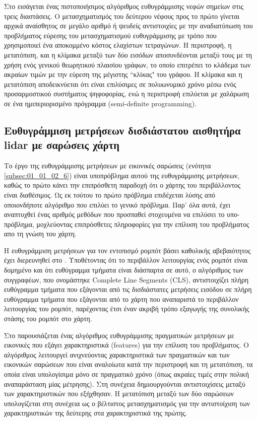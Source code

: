 Στο \cite{Yang2021} εισάγεται ένας πιστοποιήσιμος αλγόριθμος ευθυγράμμισης
νεφών σημείων στις τρεις διαστάσεις. Ο μετασχηματισμός του δεύτερου νέφους προς
το πρώτο γίνεται αρχικά αναίσθητος σε μεγάλο αριθμό ή ψευδείς αντιστοιχίες με
την αναδιατύπωση του προβλήματος εύρεσης του μετασχηματισμού ευθυγράμμισης με
τρόπο που χρησιμοποιεί ένα αποκομμένο κόστος ελαχίστων τετραγώνων. Η
περιστροφή, η μετατόπιση, και η κλίμακα μεταξύ των δύο εισόδων αποσυνδέονται
μεταξύ τους με τη χρήση ενός γενικού θεωρητικού πλαισίου γράφων, το οποίο
επιτρέπει το κλάδεμα των ακραίων τιμών με την εύρεση της μέγιστης ``κλίκας" του
γράφου.  Η κλίμακα και η μετατόπιση αποδεικνύεται ότι είναι επιλύσιμες σε
πολυωνυμικό χρόνο μέσω ενός προσαρμοστικού συστήματος ψηφοφορίας, ενώ η
περιστροφή επιλύεται με χαλάρωση σε ένα ημιπεριορισμένο πρόγραμμα
(semi-definite programming).

\subsection{Ευθυγράμμιση μετρήσεων δισδιάστατου αισθητήρα lidar με σαρώσεις
χάρτη}
\label{subsection:02_02_02:2}

Το έργο της ευθυγράμμισης μετρήσεων με εικονικές σαρώσεις (ενότητα
\ref{subsec:01_01_02_6}) είναι υποπρόβλημα αυτού της ευθυγράμμισης μετρήσεων,
καθώς το πρώτο κάνει την επιπρόσθετη παραδοχή ότι ο χάρτης του περιβάλλοντος
είναι διαθέσιμος. Ως εκ τούτου το πρώτο πρόβλημα επιδέχεται λύσης από
οποιονδήποτε αλγόριθμο που επιλύει το γενικό πρόβλημα. Παρ' όλα αυτά, έχει
αναπτυχθεί ένας αριθμός μεθόδων που προσπαθεί στοχευμένα να επιλύσει το
υπο-πρόβλημα, μοχλεύοντας επιπρόσθετες πληροφορίες για την επίλυση του
προβλήματος απο τη γνώση του χάρτη.

Η ευθυγράμμιση μετρήσεων για τον εντοπισμό ρομπότ βάσει καθολικής αβεβαιότητος
έχει διερευνηθεί στο \cite{XuZezhong}. Υποθέτοντας ότι το περιβάλλον
λειτουργίας ενός ρομπότ είναι δομημένο και ότι ευθύγραμμα τμήματα είναι
διάσπαρτα σε αυτό, ο αλγόριθμος των συγγραφέων, που ονομάστηκε Complete Line
Segments (CLS), αντιστοιχίζει πλήρη ευθύγραμμα τμήματα που εξάγονται από τις
δισδιάστατες μετρήσεις εισόδου σε πλήρη ευθύγραμμα τμήματα που εξάγονται από το
χάρτη που αναπαριστά το περιβάλλον λειτουργίας του ρομπότ, παρέχοντας έτσι έναν
ακριβή τρόπο εξαγωγής της συνολικής στάσης του ρομπότ στο χάρτη.

Στο \cite{Lingemann2005a} παρουσιάζεται ένας αλγόριθμος ευθυγράμμισης
πραγματικών μετρήσεων με εικονικές που εξάγει χαρακτηριστικά (features) για την
επίλυση του προβλήματος.  Ο αλγόριθμος λειτουργεί ανιχνεύοντας χαρακτηριστικά
των πραγματικών και των εικονικών σαρώσεων που είναι αναλοίωτα κατά την
περιστροφή και τη μετατόπιση, τα οποία είναι υπολογίσιμα μόνο σε πραγματικό
χρόνο (όπως ακραίες τιμές στην πολική αναπαράσταση μίας μέτρησης). Στη
συνέχεια δημιουργούνται αντιστοιχίσεις μεταξύ των χαρακτηριστικών που
εξήχθησαν. Η μετατόπιση μεταξύ των δύο σαρώσεων υπολογίζεται στη συνέχεια ως ο
βέλτιστος μετασχηματισμός για την αντιστοίχιση των χαρακτηριστικών της δεύτερης
στα χαρακτηριστικά της πρώτης.

